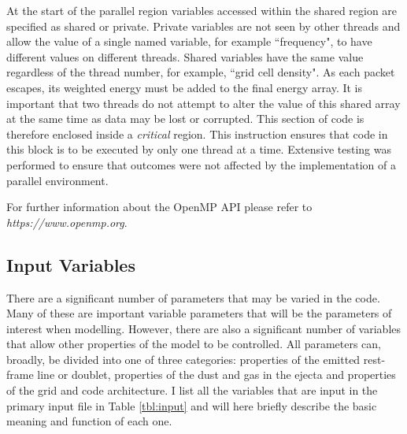 	At the start of the parallel region variables accessed within the shared region are specified as shared or private.  Private variables are not seen by other threads and allow the value of a single named variable, for example ``frequency", to have different values on different threads.  Shared variables have the same value regardless of the thread number, for example, ``grid cell density".  As each packet escapes, its weighted energy must be added to the final energy array.  It is important that two threads do not attempt to alter the value of this shared array at the same time as data may be lost or corrupted. This section of code is therefore enclosed inside a \textit{critical} region.  This instruction ensures that code in this block is to be executed by only one thread at a time.  Extensive testing was performed to ensure that outcomes were not affected by the implementation of a parallel environment.
	
	For further information about the OpenMP API please refer to \textit{https://www.openmp.org}.
	
	\subsection{Input Variables}
	
	There are a significant number of parameters that may be varied in the code.  Many of these are important variable parameters that will be the parameters of interest when modelling.  However, there are also a significant number of variables that allow other properties of the model to be controlled.  All parameters can, broadly,  be divided into one of three categories:  properties of the emitted rest-frame line or doublet, properties of the dust and gas in the ejecta and properties of the grid and code architecture.  I list all the variables that are input in the primary input file in Table \ref{tbl:input} and will here briefly describe the basic meaning and function of each one.
	
